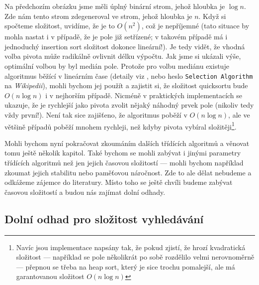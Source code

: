 Na předchozím obrázku jsme měli úplný binární strom, jehož hloubka je $\log n$. Zde nám tento strom zdegeneroval ve strom, jehož hloubka je $n$. Když si spočteme
složitost, uvidíme, že je to $O(n^2)$, což je nepříjemné (tato situace by mohla nastat i v případě, že je pole již setřízené; v takovém případě
má i jednoduchý insertion sort složitost dokonce lineární!). Je tedy
vidět, že vhodná volba pivota může radikálně ovlivnit délku výpočtu. Jak jsme si ukázali výše, optimální volbou by byl medián pole. Protože
pro volbu mediánu existuje algoritmus běžící v lineárním čase (detaily viz \cite{BFPRT:1973}, nebo heslo {\tt Selection Algorithm} na \emph{Wikipedii}),
mohli bychom jej použít a zajistit si, že složitost quicksortu bude $O(n \log n)$ i v nejhorším případě. Nicméně v praktických implementacích se ukazuje, že
je rychlejší jako pivota zvolit nějaký náhodný prvek pole (nikoliv tedy vždy první!). Není tak sice zajišťeno, že algoritmus poběží v $O(n\log n)$, ale ve
většině případů poběží mnohem rychleji, než kdyby pivota vybíral složitěji\footnote{Navíc jsou implementace napsány tak, že pokud zjistí, že hrozí kvadratická
složitost --- například se pole několikrát po sobě rozdělilo velmi nerovnoměrně --- přepnou se třeba na heap sort, který je sice trochu pomalejší, ale má
garantovanou složitost $O(n\log n)$}.

Mohli bychom nyní pokračovat zkoumáním dalších třídících algoritmů a věnovat tomu ještě několik kapitol. Také bychom se mohli zabývat i jinými parametry
třídících algoritmů než jen jejich časovou složitostí --- mohli bychom například zkoumat jejich stabilitu nebo paměťovou náročnost. Zde to ale dělat
nebudeme a odkážeme zájemce do literatury. Místo toho se ještě chvíli budeme zabývat časovou složitostí a budou nás zajímat dolní odhady.

\subsection*{Dolní odhad pro složitost vyhledávání}

